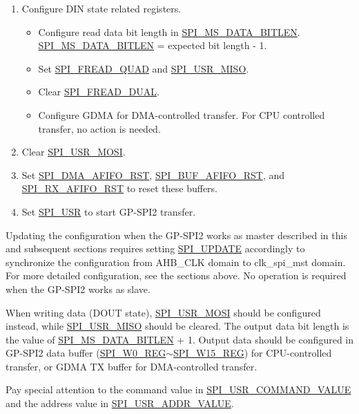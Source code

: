 \documentclass[main\_\_EN.tex]{subfiles}
\begin{document}
\begin{enumerate}
    \item Configure DIN state related registers.
        \begin{itemize}
            \item Configure read data bit length in \hyperref[fielddesc:SPIMSDATABITLEN]{SPI\_MS\_DATA\_BITLEN}. \hyperref[fielddesc:SPIMSDATABITLEN]{SPI\_MS\_DATA\_BITLEN} = expected bit length - 1.
            \item Set \hyperref[fielddesc:SPIFREADQUAD]{SPI\_FREAD\_QUAD} and \hyperref[fielddesc:SPIUSRMISO]{SPI\_USR\_MISO}.
            \item Clear \hyperref[fielddesc:SPIFREADDUAL]{SPI\_FREAD\_DUAL}.
            \item Configure GDMA for DMA-controlled transfer. For CPU controlled transfer, no action is needed.
        \end{itemize}   
    \item Clear \hyperref[fielddesc:SPIUSRMOSI]{SPI\_USR\_MOSI}.
    \item Set \hyperref[fielddesc:SPIDMAAFIFORST]{SPI\_DMA\_AFIFO\_RST}, \hyperref[fielddesc:SPIBUFAFIFORST]{SPI\_BUF\_AFIFO\_RST}, and \hyperref[fielddesc:SPIRXAFIFORST]{SPI\_RX\_AFIFO\_RST} to reset these buffers.
    \item Set \hyperref[fielddesc:SPIUSR]{SPI\_USR} to start GP-SPI2 transfer. 
\end{enumerate}

\begin{tiplisting}
Updating the configuration when the GP-SPI2 works as master described in this and subsequent sections requires setting \hyperref[fielddesc:SPIUPDATE]{SPI\_UPDATE} accordingly to
synchronize the configuration from AHB\_CLK domain to clk\_spi\_mst domain. For more detailed configuration, see the sections above. No operation is required when the GP-SPI2 works as slave.
\end{tiplisting}

When writing data (DOUT state), \hyperref[fielddesc:SPIUSRMOSI]{SPI\_USR\_MOSI} should be configured instead, while \hyperref[fielddesc:SPIUSRMISO]{SPI\_USR\_MISO} should be cleared. The output data bit length is the value of \hyperref[fielddesc:SPIMSDATABITLEN]{SPI\_MS\_DATA\_BITLEN} + 1. Output data should be configured in GP-SPI2 data buffer (\hyperref[regdesc:SPIW0REG]{SPI\_W0\_REG}$\sim$\hyperref[regdesc:SPIW15REG]{SPI\_W15\_REG}) for CPU-controlled transfer, or GDMA TX buffer for DMA-controlled transfer.

Pay special attention to the command value in \hyperref[fielddesc:SPIUSRCOMMANDVALUE]{SPI\_USR\_COMMAND\_VALUE} and the address value in \hyperref[fielddesc:SPIUSRADDRVALUE]{SPI\_USR\_ADDR\_VALUE}. 
\end{document}
